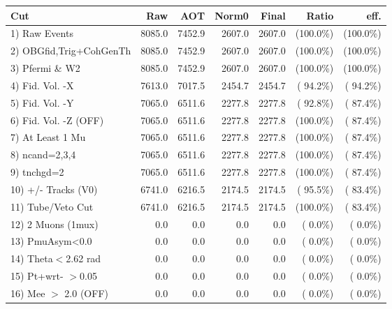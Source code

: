  \begin{table}[h!]\centering
 \begin{tabular}{||l||r|r|r|r|r|r||}
 \hline
 \hline
 Cut & Raw & AOT & Norm0 & Final & Ratio & eff.       \\
 \hline
  1) Raw Events           &       8085.0 &       7452.9 &       2607.0 &       2607.0 & (100.0\%) & (100.0\%) \\
  2) OBGfid,Trig+CohGenTh &       8085.0 &       7452.9 &       2607.0 &       2607.0 & (100.0\%) & (100.0\%) \\
  3) Pfermi \& W2         &       8085.0 &       7452.9 &       2607.0 &       2607.0 & (100.0\%) & (100.0\%) \\
  4) Fid. Vol. -X         &       7613.0 &       7017.5 &       2454.7 &       2454.7 & ( 94.2\%) & ( 94.2\%) \\
  5) Fid. Vol. -Y         &       7065.0 &       6511.6 &       2277.8 &       2277.8 & ( 92.8\%) & ( 87.4\%) \\
  6) Fid. Vol. -Z (OFF)   &       7065.0 &       6511.6 &       2277.8 &       2277.8 & (100.0\%) & ( 87.4\%) \\
  7) At Least 1 Mu        &       7065.0 &       6511.6 &       2277.8 &       2277.8 & (100.0\%) & ( 87.4\%) \\
  8) ncand=2,3,4          &       7065.0 &       6511.6 &       2277.8 &       2277.8 & (100.0\%) & ( 87.4\%) \\
  9) tnchgd=2             &       7065.0 &       6511.6 &       2277.8 &       2277.8 & (100.0\%) & ( 87.4\%) \\
 10) +/- Tracks (V0)      &       6741.0 &       6216.5 &       2174.5 &       2174.5 & ( 95.5\%) & ( 83.4\%) \\
 11) Tube/Veto Cut        &       6741.0 &       6216.5 &       2174.5 &       2174.5 & (100.0\%) & ( 83.4\%) \\
 12) 2 Muons (1mux)       &          0.0 &          0.0 &          0.0 &          0.0 & (  0.0\%) & (  0.0\%) \\
 13) PmuAsym<0.0          &          0.0 &          0.0 &          0.0 &          0.0 & (  0.0\%) & (  0.0\%) \\
 14) Theta$<$2.62 rad     &          0.0 &          0.0 &          0.0 &          0.0 & (  0.0\%) & (  0.0\%) \\
 15) Pt+wrt- $>$0.05      &          0.0 &          0.0 &          0.0 &          0.0 & (  0.0\%) & (  0.0\%) \\
 16) Mee $>$ 2.0  (OFF)   &          0.0 &          0.0 &          0.0 &          0.0 & (  0.0\%) & (  0.0\%) \\

\end{tabular}
\end{table}
